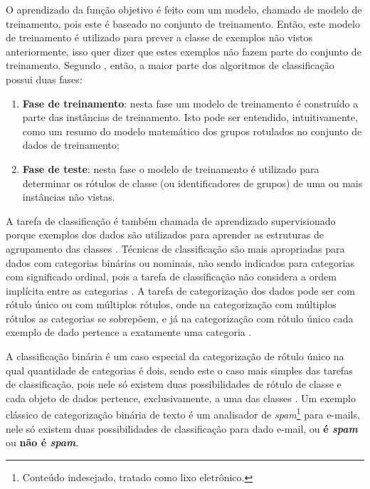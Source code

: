             O aprendizado da função objetivo é feito com um modelo, chamado de modelo de treinamento, pois este é baseado no conjunto de treinamento. 
            Então, este modelo de treinamento é utilizado para prever a classe de exemplos não vistos anteriormente, isso quer dizer que estes exemplos não fazem parte do conjunto de treinamento.
            Segundo , então, a maior parte dos algoritmos de classificação possui duas fases:
            \begin{enumerate}
                \item \textbf{Fase de treinamento}: nesta fase um modelo de treinamento é construído a parte das instâncias de treinamento. Isto pode ser entendido, intuitivamente, como um resumo do modelo matemático dos grupos rotulados no conjunto de dados de treinamento;
                
                \item \textbf{Fase de teste}: nesta fase o modelo de treinamento é utilizado para determinar os rótulos de classe (ou identificadores de grupos) de uma ou mais instâncias não vistas.
            \end{enumerate}
                
            A tarefa de classificação é também chamada de aprendizado supervisionado porque exemplos dos dados são utilizados para aprender as estruturas de agrupamento das classes \cite[p.~285]{Aggarwal_DMTT_2015}.
            Técnicas de classificação são mais apropriadas para dados com categorias binárias ou nominais, não sendo indicados para categorias com significado ordinal, pois a tarefa de classificação não considera a ordem implícita entre as categorias \cite[p.~147]{TanIDM2014}.
            A tarefa de categorização dos dados pode ser com rótulo único ou com múltiplos rótulos, onde na categorização com múltiplos rótulos as categorias se sobrepõem, e já na categorização com rótulo único cada exemplo de dado pertence a exatamente uma categoria \cite[p.~67]{Feldman:2006:TMH:1076381} \cite[p.~306]{TanIDM2014}.
            
            A classificação binária é um caso especial da categorização de rótulo único na qual quantidade de categorias é dois, sendo este o caso mais simples das tarefas de classificação, pois nele só existem duas possibilidades de rótulo de classe e cada objeto de dados pertence, exclusivamente, a uma das classes \cite[p.~67]{Feldman:2006:TMH:1076381} \cite[p.~81]{Jo2018TMCIBDC}.
            Um exemplo clássico de categorização binária de texto é um analisador de \textit{spam}\footnote{Conteúdo indesejado, tratado como lixo eletrônico.} para e-mails, nele só existem duas possibilidades de classificação para dado e-mail, ou \textbf{é \textit{spam}} ou \textbf{não é \textit{spam}}.
        
